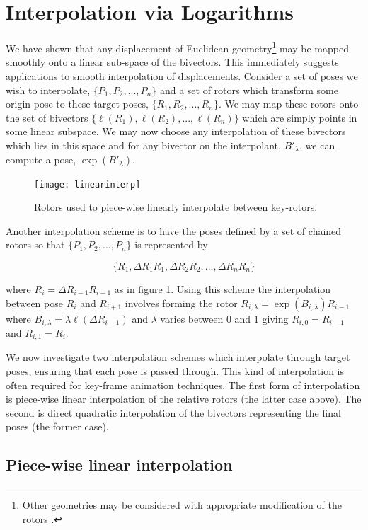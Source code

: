 \section{Interpolation via Logarithms}

We have shown that any displacement of Euclidean geometry\footnote{Other geometries may be
considered with appropriate modification of the rotors \cite{cgwcga}.} may be mapped smoothly
onto a linear sub-space of the bivectors. This immediately suggests applications to smooth interpolation
of displacements. Consider a set of poses we wish to interpolate, $\{P_1, P_2, ..., P_n\}$ and a set
of rotors which transform some origin pose to these target poses, $\{R_1, R_2, ..., R_n\}$. We
may map these rotors onto the set of bivectors $\{\ell(R_1), \ell(R_2), ..., \ell(R_n)\}$ which
are simply points in some linear subspace. We may now choose any interpolation of these bivectors
which lies in this space and for any bivector on the interpolant, $B'_\lambda$, we can compute
a pose, $\exp(B'_\lambda)$.

\begin{figure}\centering
\texttt{[image: linearinterp]}
\caption{\label{fig:linearinterp}Rotors used to piece-wise linearly interpolate between key-rotors.}
\end{figure}

Another interpolation scheme is to have the poses defined by a set of chained rotors so that
$\{P_1, P_2, ..., P_n\}$ is represented by 

\[\{R_1, \Delta R_1R_1, \Delta R_2 R_2, ..., \Delta R_n R_n\}\]

where $R_i = \Delta R_{i-1} R_{i-1}$ as in figure \ref{fig:linearinterp}. Using
this scheme the interpolation between pose $R_i$ and $R_{i+1}$ involves forming
the rotor $R_{i,\lambda} = \exp(B_{i,\lambda})R_{i-1}$ where $B_{i,\lambda} =
\lambda \ell(\Delta R_{i-1})$ and $\lambda$ varies between $0$ and $1$ giving
$R_{i,0} = R_{i-1}$ and $R_{i,1} = R_i$.

We now investigate two interpolation schemes which interpolate through target
poses, ensuring that each pose is passed through. This kind of interpolation is
often required for key-frame animation techniques. The first form of
interpolation is piece-wise linear interpolation of the relative rotors (the
		latter case above). The second is direct quadratic
interpolation of the bivectors representing the final poses (the former case).

\subsection{Piece-wise linear interpolation}

